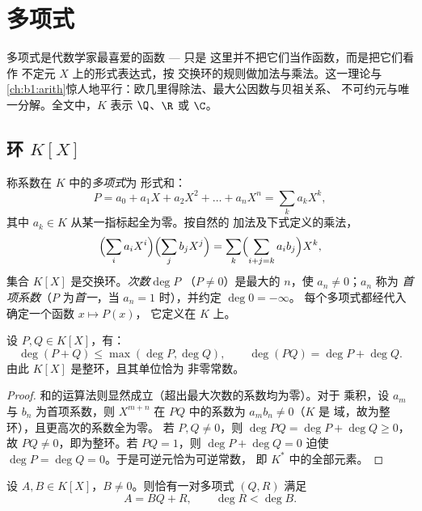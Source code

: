 \chapter{多项式}\label{ch:b1:poly}

多项式是代数学家最喜爱的函数 --- 只是
这里并不把它们当作函数，而是把它们看作
不定元 $X$ 上的形式表达式，按
交换环的规则做加法与乘法。这一理论与
\cref{ch:b1:arith}惊人地平行：欧几里得除法、最大公因数与贝祖关系、
不可约元与唯一分解。全文中，$K$
表示 $\Q$、$\R$ 或 $\C$。

\section{环 $K[X]$}

\begin{definition}[多项式，次数]\label{def:b1:poly:def}
称系数在 $K$ 中的\emph{多项式}为
形式和：
\[
P = a_0 + a_1 X + a_2 X^2 + \dots + a_n X^n
= \sum_{k} a_k X^k,
\]
其中 $a_k \in K$ 从某一指标起全为零。按自然的
加法及下式定义的乘法，
\[
\Bigl(\sum_i a_i X^i\Bigr)\Bigl(\sum_j b_j X^j\Bigr)
= \sum_k \Bigl(\sum_{i+j=k} a_i b_j\Bigr) X^k,
\]
集合 $K[X]$ 是交换环。\emph{次数}$\deg P$
（$P \neq 0$）是最大的 $n$，使 $a_n \neq 0$；$a_n$ 称为
\emph{首项系数}（$P$ 为\emph{首一}，当 $a_n = 1$ 时），并约定 $\deg 0 = -\infty$。
每个多项式都经代入确定一个函数 $x \mapsto P(x)$，
它定义在 $K$ 上。
\end{definition}

\begin{proposition}[次数的运算法则；整环]\label{prop:b1:poly:degree}
设 $P, Q \in K[X]$，有：
\[
\deg(P + Q) \leq \max(\deg P, \deg Q),
\qquad
\deg(PQ) = \deg P + \deg Q .
\]
由此 $K[X]$ 是整环，且其单位恰为
非零常数。
\end{proposition}

\begin{proof}
和的运算法则显然成立（超出最大次数的系数均为零）。对于
乘积，设 $a_m$ 与 $b_n$ 为首项系数，则
$X^{m+n}$ 在 $PQ$ 中的系数为 $a_m b_n \neq 0$（$K$ 是
域，故为整环），且更高次的系数全为零。
若 $P, Q \neq 0$，则 $\deg PQ = \deg P + \deg Q \geq 0$，故 $PQ \neq
0$，即为整环。若 $PQ = 1$，则 $\deg P + \deg Q = 0$ 迫使
$\deg P = \deg Q = 0$。于是可逆元恰为可逆常数，
即 $K^*$ 中的全部元素。
\end{proof}

\begin{theorem}[欧几里得除法]\label{thm:b1:poly:division}
设 $A, B \in K[X]$，$B \neq 0$。则恰有一对多项式 $(Q,
R)$ 满足
\[
A = BQ + R, \qquad \deg R < \deg B .
\]
\end{theorem}

